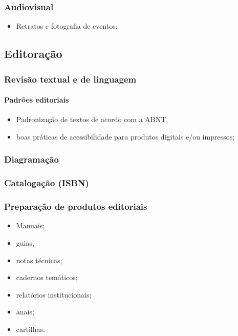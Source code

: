 \subsubsection{Audiovisual}

\begin{itemize}
	\item
	Retratos e fotografia de eventos;
\end{itemize}

\subsection{Editoração}

\subsubsection{Revisão textual e de linguagem}

\paragraph{Padrões editoriais}

\begin{itemize}

	\item
	Padronização de textos de acordo com a ABNT,
	\item
	boas práticas de acessibilidade para produtos digitais e/ou impressos;
\end{itemize}

\subsubsection{Diagramação}

\subsubsection{Catalogação (ISBN)}

\subsubsection{Preparação de produtos editoriais}

\begin{itemize}
	\item
	Manuais;
	\item
	guias;
	\item
	notas técnicas;
	\item
	cadernos temáticos;
	\item
	relatórios institucionais;
	\item
	anais;
	\item
	cartilhas.
\end{itemize}

